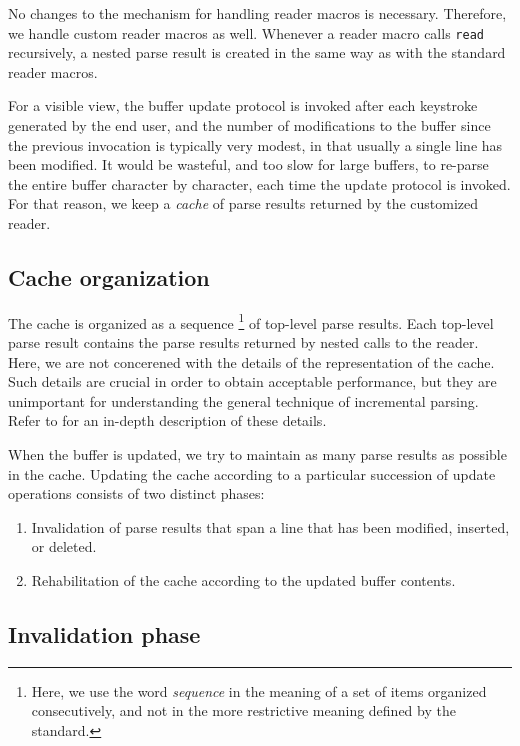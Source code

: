 No changes to the mechanism for handling reader macros is necessary.
Therefore, we handle custom reader macros as well.  Whenever a reader
macro calls \texttt{read} recursively, a nested parse result is
created in the same way as with the standard reader macros.

For a visible view, the buffer update protocol is invoked after each
keystroke generated by the end user, and the number of modifications
to the buffer since the previous invocation is typically very modest,
in that usually a single line has been modified.  It would be
wasteful, and too slow for large buffers, to re-parse the entire
buffer character by character, each time the update protocol is
invoked.  For that reason, we keep a \emph{cache} of parse results
returned by the customized reader.

\subsection{Cache organization}

The cache is organized as a sequence%
\footnote{Here, we use the word \emph{sequence} in the meaning of a
  set of items organized consecutively, and not in the more
  restrictive meaning defined by the \commonlisp{} standard.}  of
top-level parse results.  Each top-level parse result contains the
parse results returned by nested calls to the reader.  Here, we are
not concerened with the details of the representation of the cache.
Such details are crucial in order to obtain acceptable performance,
but they are unimportant for understanding the general technique of
incremental parsing.  Refer to  for an
in-depth description of these details.

When the buffer is updated, we try to maintain as many parse results
as possible in the cache.  Updating the cache according to a
particular succession of update operations consists of two distinct
phases:

\begin{enumerate}
\item Invalidation of parse results that span a line that has been
  modified, inserted, or deleted.
\item Rehabilitation of the cache according to the updated buffer
  contents.
\end{enumerate}

\subsection{Invalidation phase}

